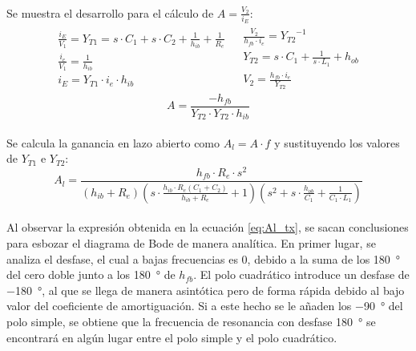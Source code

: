 \paragraph{}
Se muestra el desarrollo para el c\'alculo de $A = \frac{V_2}{i_E}$:
\[
\begin{array}{rl} 
      \begin{array}{l}
   \frac{i_E}{V_1} = Y_{T1} = s\cdot C_1 + s\cdot C_2 + \frac{1}{h_{ib}} + \frac{1}{R_{e}} \\
   \frac{i_e}{V_{1}} = \frac{1}{h_{ib}} \\
   i_E = Y_{T1} \cdot i_e \cdot h_{ib}
      \end{array}
      &
      \begin{array}{r}
   \frac{V_2}{h_{fb}\cdot i_e} = {Y_{T2}}^{-1} \\
   Y_{T2} = s\cdot C_1 + \frac{1}{s\cdot L_1} + h_{ob} \\
   V_2 = \frac{h_{fb}\cdot i_e}{Y_{T2}} 
      \end{array}
\end{array}
\]
\begin{equation}
   A = \frac{-h_{fb}}{Y_{T2} \cdot Y_{T2} \cdot h_{ib}} 
\end{equation}
\paragraph{}
Se calcula la ganancia en lazo abierto como $A_l = A \cdot f$ y sustituyendo los valores de $Y_{T1}$ e $Y_{T2}$:
\begin{equation}
   \label{eq:Al_tx}
   A_l = \frac{h_{fb} \cdot R_e \cdot s^2}{ \left( h_{ib}+R_e \right) \left( s \cdot \frac{ h_{ib} \cdot R_e (C_1+C_2)}{h_{ib}+R_e} + 1\right) \left( s^2 + s \cdot \frac{h_{ob}}{C_1} + \frac{1}{C_1 \cdot L_1}\right) }
\end{equation}
\paragraph{}
Al observar la expresi\'on obtenida en la ecuaci\'on \ref{eq:Al_tx}, se sacan conclusiones para esbozar el diagrama de Bode de manera anal\'itica. En primer lugar, se analiza el desfase, el cual a bajas frecuencias es 0, debido a la suma de los \SI{180}{\degree} del cero doble junto a los \SI{180}{\degree} de $h_{fb}$. El polo cuadr\'atico introduce un desfase de \SI{-180}{\degree}, al que se llega de manera asint\'otica pero de forma r\'apida debido al bajo valor del coeficiente de amortiguaci\'on. Si a este hecho se le añaden los \SI{-90}{\degree} del polo simple, se obtiene que la frecuencia de resonancia con desfase \SI{180}{\degree} se encontrará en algún lugar entre el polo simple y el polo cuadrático.
